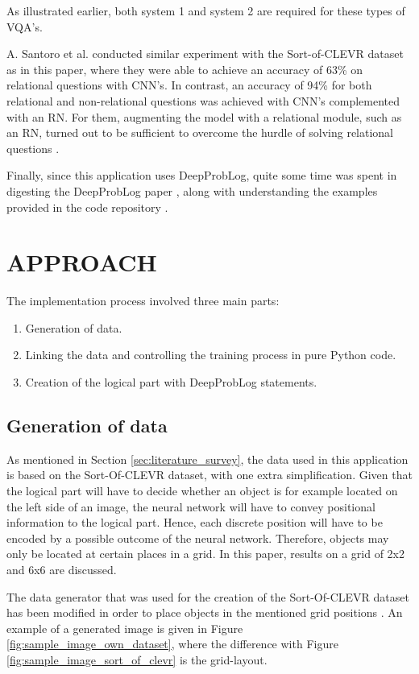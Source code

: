 \documentclass[english]{sobraep}
\begin{document}
As illustrated earlier, both system 1 and system 2 are required for these types of VQA's.

A. Santoro et al. conducted similar experiment with the Sort-of-CLEVR dataset as in this paper, where they were able to achieve an accuracy of 63\% on relational questions with CNN's. In contrast, an accuracy of 94\% for both relational and non-relational questions was achieved with CNN's complemented with an RN. For them, augmenting the model with a relational module, such as an RN, turned out to be sufficient to overcome the hurdle of solving relational questions \cite{sort_of_clevr_dataset}.

Finally, since this application uses DeepProbLog, quite some time was spent in digesting the DeepProbLog paper \cite{deepproblog}, along with understanding the  examples provided in the code repository \cite{deepproblog_code}.

\section{APPROACH}
\label{sec:approach}
The implementation process involved three main parts:
\begin{enumerate}
    \item Generation of data.
    \item Linking the data and controlling the training process in pure Python code.
    \item Creation of the logical part with DeepProbLog statements.
\end{enumerate}

\subsection{Generation of data}
As mentioned in Section \ref{sec:literature_survey}, the data used in this application is based on the Sort-Of-CLEVR dataset, with one extra simplification. Given that the logical part will have to decide whether an object is for example located on the left side of an image, the neural network will have to convey positional information to the logical part. Hence, each discrete position will have to be encoded by a possible outcome of the neural network. Therefore, objects may only be located at certain places in a grid. In this paper, results on a grid of 2x2 and 6x6 are discussed.

The data generator that was used for the creation of the Sort-Of-CLEVR dataset has been modified in order to place objects in the mentioned grid positions \cite{sort_of_clevr_dataset}. An example of a generated image is given in Figure \ref{fig:sample_image_own_dataset}, where the difference with Figure \ref{fig:sample_image_sort_of_clevr} is the grid-layout.
\end{document}

